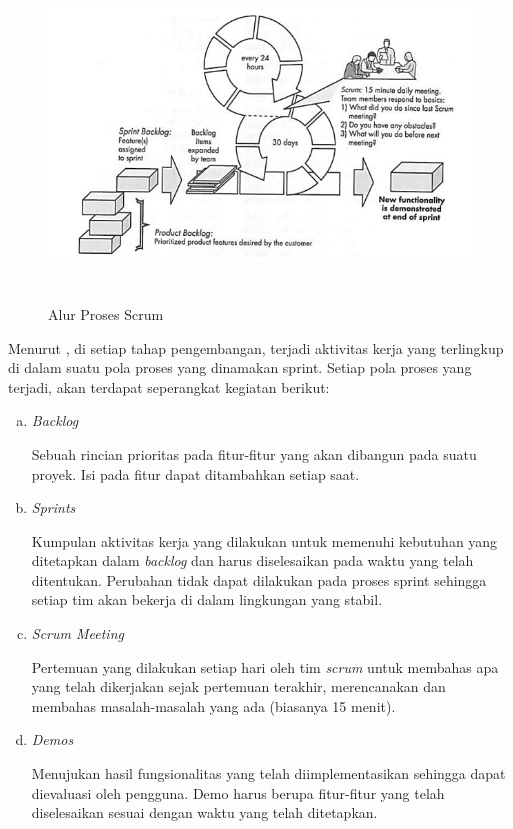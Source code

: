 \begin{figure}[H]
\centering
{\includegraphics [width = 12.5cm, height= 8cm]{gambar/alur_proses_scrum}}
\caption{Alur Proses Scrum \citep{pressman2010}}
\label{alur_proses_scrum}
\end{figure}	

\par Menurut \cite{pressman2010}, di setiap tahap pengembangan, terjadi aktivitas kerja yang terlingkup di dalam suatu pola proses yang dinamakan sprint. Setiap pola proses yang terjadi, akan terdapat seperangkat kegiatan berikut: 

\begin{enumerate}[a.]
\item \textit{Backlog}
 \par Sebuah rincian prioritas pada fitur-fitur yang akan dibangun pada suatu proyek. Isi pada fitur dapat ditambahkan setiap saat. 
 \item \textit{Sprints} 
 \par Kumpulan aktivitas kerja yang dilakukan untuk memenuhi kebutuhan yang ditetapkan dalam \textit{backlog} dan harus diselesaikan pada waktu yang telah ditentukan. Perubahan tidak dapat dilakukan pada proses sprint sehingga setiap tim akan bekerja di dalam lingkungan yang stabil. 
 \item \textit{Scrum Meeting} 
 \par Pertemuan yang dilakukan setiap hari oleh tim \textit{scrum} untuk membahas apa yang telah dikerjakan sejak pertemuan terakhir, merencanakan dan membahas masalah-masalah yang ada (biasanya 15 menit).
 \item \textit{Demos} 
 \par Menujukan hasil fungsionalitas yang telah diimplementasikan sehingga dapat dievaluasi oleh pengguna. 
 Demo harus berupa fitur-fitur yang telah diselesaikan sesuai dengan waktu yang telah ditetapkan. 
\end{enumerate}

